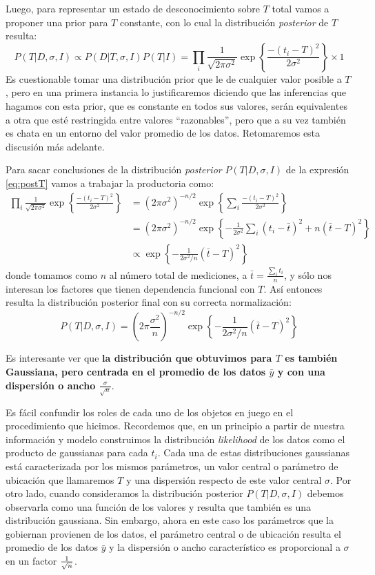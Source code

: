 \documentclass[aps,onecolumn,12pt,notitlepage]{revtex4-1}
\begin{document}
Luego, para representar un estado de desconocimiento sobre $T$ total vamos a proponer una prior para $T$ constante, con lo cual la distribución \textit{posterior} de $T$ resulta:
\begin{equation}
{\displaystyle P(T|D,\sigma,I) \propto  P(D|T,\sigma,I) P(T|I) = \prod_{i} \frac{1}{\sqrt{2\pi \sigma^2}} \exp\left\{\frac{-(t_{i}-T)^2}{2\sigma^2}\right\} \times 1}
\label{eq:postT}
\end{equation}
Es cuestionable tomar una distribución prior que le de cualquier valor posible a $T$, pero en una primera instancia lo justificaremos diciendo que las inferencias que hagamos con esta prior, que es constante en todos sus valores, serán equivalentes a otra que esté restringida entre valores ``razonables'', pero que a su vez también es chata en un entorno del valor promedio de los datos. Retomaremos esta discusión más adelante. 

Para sacar conclusiones de la distribución \textit{posterior} $P(T|D,\sigma,I)$ de la expresión \ref{eq:postT} vamos a trabajar la productoria como:
\begin{align}
\prod_{i} \frac{1}{\sqrt{2\pi\sigma^2}} \exp\left\{\frac{-(t_{i}-T)^2}{2\sigma^2}\right\} &= \left(2\pi\sigma^2\right)^{-n/2} \exp\left\{\sum_{i} \frac{-(t_{i}-T)^2}{2\sigma^2}\right\}\\
&=\left(2\pi\sigma^2\right)^{-n/2}\exp\left\{-\frac{1}{2\sigma^2}\sum_{i} (t_{i} -\bar{t})^2+n(\bar{t}-T)^2\right\} \\
&\propto\exp\left\{-\frac{1}{2\sigma^{2}/n}(\bar{t}-T)^2\right\} 
\end{align}
donde tomamos como $n$ al número total de mediciones, a $\bar{t} = \frac{\sum_{i} t_{i}}{n}$, y sólo nos interesan los factores que tienen dependencia funcional con $T$. Así entonces resulta la distribución posterior final con su correcta normalización:
\begin{equation}
P(T|D,\sigma,I) = \left(2\pi\frac{\sigma^2}{n}\right)^{-n/2}\exp\left\{-\frac{1}{2\sigma^{2}/n}(\bar{t}-T)^2\right\} 
\end{equation}

Es interesante ver que \textbf{la distribución que obtuvimos para $T$ es también Gaussiana, pero centrada en el promedio de los datos $\bar{y}$ y con una dispersión o ancho $\frac{\sigma}{\sqrt{n}}$}.

Es fácil confundir los roles de cada uno de los objetos en juego en el procedimiento que hicimos. Recordemos que, en un principio a partir de nuestra información y modelo construimos la distribución \textit{likelihood} de los datos como el producto de gaussianas para cada $t_{i}$. Cada una de estas distribuciones gaussianas está caracterizada por los mismos parámetros, un valor central o parámetro de ubicación que llamaremos $T$ y una dispersión respecto de este valor central $\sigma$. Por otro lado, cuando consideramos la distribución posterior $P(T|D,\sigma,I)$ debemos observarla como una función de los valores y resulta que también es una distribución gaussiana. Sin embargo, ahora en este caso los parámetros que la gobiernan provienen de los datos, el parámetro central o de ubicación resulta el promedio de los datos $\bar{y}$ y la dispersión o ancho característico es proporcional a $\sigma$ en un factor $1\over \sqrt{n}$.
\end{document}
